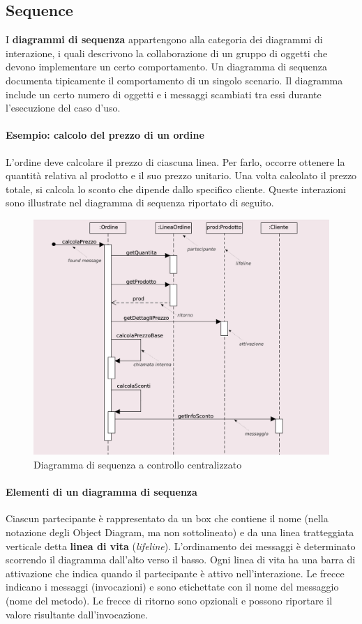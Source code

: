 \subsection{Sequence}

I \textbf{diagrammi di sequenza} appartengono alla categoria dei diagrammi di interazione, i quali descrivono la collaborazione di un gruppo di oggetti che devono implementare un certo comportamento. Un diagramma di sequenza documenta tipicamente il comportamento di un singolo scenario. Il diagramma include un certo numero di oggetti e i messaggi scambiati tra essi durante l’esecuzione del caso d’uso.

\paragraph{Esempio: calcolo del prezzo di un ordine}
L’ordine deve calcolare il prezzo di ciascuna linea. Per farlo, occorre ottenere la quantità relativa al prodotto e il suo prezzo unitario. Una volta calcolato il prezzo totale, si calcola lo sconto che dipende dallo specifico cliente. Queste interazioni sono illustrate nel diagramma di sequenza riportato di seguito.

\begin{figure}[H]
    \centering
    \includegraphics[width=0.75\linewidth]{assets/UML/sequence/sequence-1.png}
    \caption{Diagramma di sequenza a controllo centralizzato}
\end{figure}

\paragraph{Elementi di un diagramma di sequenza}
Ciascun partecipante è rappresentato da un box che contiene il nome (nella notazione degli Object Diagram, ma non sottolineato) e da una linea tratteggiata verticale detta \textbf{linea di vita} (\textit{lifeline}). L’ordinamento dei messaggi è determinato scorrendo il diagramma dall’alto verso il basso. Ogni linea di vita ha una barra di attivazione che indica quando il partecipante è attivo nell’interazione. Le frecce indicano i messaggi (invocazioni) e sono etichettate con il nome del messaggio (nome del metodo). Le frecce di ritorno sono opzionali e possono riportare il valore risultante dall’invocazione.

